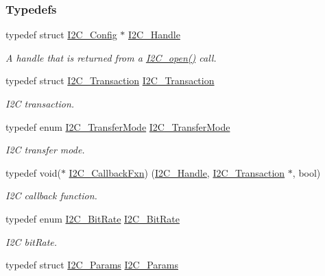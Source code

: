 \subsubsection*{Typedefs}
\begin{DoxyCompactItemize}
\item 
typedef struct \hyperlink{struct_i2_c___config}{I2\+C\+\_\+\+Config} $\ast$ \hyperlink{_i2_c_8h_a5809a229f8395c87f59e63128195c1bf}{I2\+C\+\_\+\+Handle}
\begin{DoxyCompactList}\small\item\em A handle that is returned from a \hyperlink{_i2_c_8h_ae1aa99e1fee4517406018e10025cca0e}{I2\+C\+\_\+open()} call. \end{DoxyCompactList}\item 
typedef struct \hyperlink{struct_i2_c___transaction}{I2\+C\+\_\+\+Transaction} \hyperlink{_i2_c_8h_a54d2d506a10628451340a2901bdb6277}{I2\+C\+\_\+\+Transaction}
\begin{DoxyCompactList}\small\item\em I2\+C transaction. \end{DoxyCompactList}\item 
typedef enum \hyperlink{_i2_c_8h_a39f3b9340fc4ee241b0d2da9b2841c26}{I2\+C\+\_\+\+Transfer\+Mode} \hyperlink{_i2_c_8h_a74176ca6d49d4081eeacb270a8e9c800}{I2\+C\+\_\+\+Transfer\+Mode}
\begin{DoxyCompactList}\small\item\em I2\+C transfer mode. \end{DoxyCompactList}\item 
typedef void($\ast$ \hyperlink{_i2_c_8h_aa7389002843eba77425c73b441358fd1}{I2\+C\+\_\+\+Callback\+Fxn}) (\hyperlink{_i2_c_8h_a5809a229f8395c87f59e63128195c1bf}{I2\+C\+\_\+\+Handle}, \hyperlink{struct_i2_c___transaction}{I2\+C\+\_\+\+Transaction} $\ast$, bool)
\begin{DoxyCompactList}\small\item\em I2\+C callback function. \end{DoxyCompactList}\item 
typedef enum \hyperlink{_i2_c_8h_ac954e3197f04c50293db466c4abb6fbe}{I2\+C\+\_\+\+Bit\+Rate} \hyperlink{_i2_c_8h_a4614c71f39459a9cc729b1f183d795f3}{I2\+C\+\_\+\+Bit\+Rate}
\begin{DoxyCompactList}\small\item\em I2\+C bit\+Rate. \end{DoxyCompactList}\item 
typedef struct \hyperlink{struct_i2_c___params}{I2\+C\+\_\+\+Params} \hyperlink{_i2_c_8h_ae6b2a2e3bc3716b5716ad6c1f10d7c1d}{I2\+C\+\_\+\+Params}

\end{DoxyCompactItemize}
